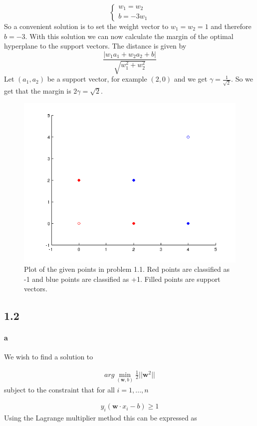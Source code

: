 \documentclass{article}
\begin{document}
\[
\begin{cases}
w_1 = w_2\\
b = -3w_1
\end{cases}
\]
So a convenient solution is to set the weight vector to $w_1 = w_2 = 1$ and therefore $b=-3$.
With this solution we can now calculate the margin of the optimal hyperplane to the support vectors. 
The distance is given by
\[
  \frac{|w_1a_1+w_2a_2+b |}{\sqrt{w_1^2+w_2^2}}
\]
Let $(a_1,a_2)$ be a support vector, for example $(2,0)$ and we get $\gamma = \frac{1}{\sqrt2}$.
So we get that the margin is $2\gamma = \sqrt2$.
\begin{figure}
\includegraphics[scale=0.6]{pics/plot11.png}
\caption{Plot of the given points in problem 1.1. 
  Red points are classified as -1 and blue points are classified as +1. 
Filled points are support vectors.}
\end{figure}
\subsection*{1.2}
\paragraph{a}

We wish to find a solution to

\begin{align}
  arg \min_{(\mathbf{w}, b)} \frac{1}{2} \lvert \rvert \mathbf{w}^2 \lvert \rvert
\end{align}
subject to the constraint that for all $i = 1, ... , n$

\begin{align}
  y_i (\mathbf{w} \cdot x_i - b) \geq 1
\end{align}
Using the Lagrange multiplier method this can be expressed as
\end{document}
